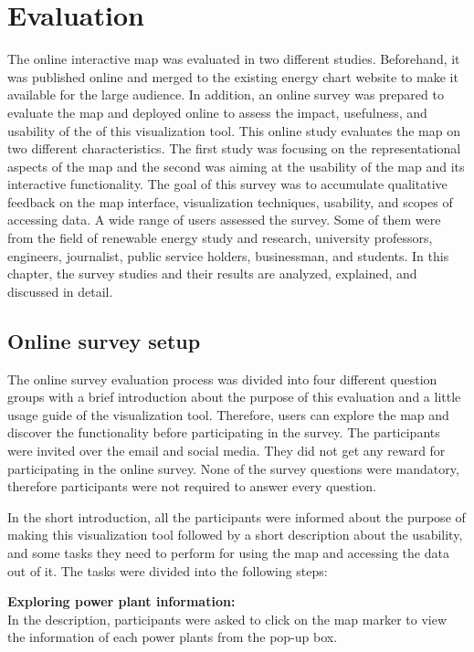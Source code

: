 \chapter{Evaluation}
\label{chap:evaluation}

The online interactive map was evaluated in two different studies. Beforehand, it was published online and merged to the existing energy chart website to make it available for the large audience. In addition, an online survey was prepared to evaluate the map and deployed online to assess the impact, usefulness, and usability of the of this visualization tool.  This online study evaluates the map on two different characteristics. The first study was focusing on the representational aspects of the map and the second was aiming at the usability of the map and its interactive functionality. The goal of this survey was to accumulate qualitative feedback on the map interface, visualization techniques, usability, and scopes of accessing data. A wide range of users assessed the survey. Some of them were from the field of renewable energy study and research, university professors, engineers, journalist, public service holders, businessman, and students. In this chapter, the survey studies and their results are analyzed, explained, and discussed in detail.

\section{Online survey setup}
\label{chap:suveySetup}

The online survey evaluation process was divided into four different question groups with a brief introduction about the purpose of this evaluation and a little usage guide of the visualization tool. Therefore, users can explore the map and discover the functionality before participating in the survey. The participants were invited over the email and social media. They did not get any reward for participating in the online survey. None of the survey questions were mandatory, therefore participants were not required to answer every question. 

In the short introduction, all the participants were informed about the purpose of making this visualization tool followed by a short description about the usability, and some tasks they need to perform for using the map and accessing the data out of it. The tasks were divided into the following steps:

\textbf{Exploring power plant information:}\\
In the description, participants were asked to click on the map marker to view the information of each power plants from the pop-up box. 


